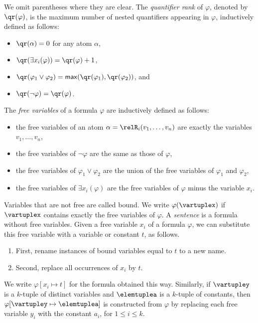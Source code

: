 \noindent
We omit parentheses where they are clear.
The \emph{quantifier rank} of $\varphi$, denoted by $\qr(\varphi)$, is the maximum number of nested quantifiers appearing in $\varphi$, inductively defined as follows:
\begin{itemize}
  \item $\qr(\alpha) = 0$ for any atom $\alpha$,
  \item $\qr(\exists{x_{i}}(\varphi)) = \qr(\varphi) + 1$,
  \item $\qr(\varphi_{1} \lor \varphi_{2}) = \mathsf{max}(\qr(\varphi_{1}), \qr(\varphi_{2}))$, and
  \item $\qr(\neg \varphi)  = \qr(\varphi)$.
\end{itemize}

\begin{samepage}%
\noindent%
The \emph{free variables} of a formula $\varphi$ are inductively defined as follows:
\begin{itemize}
  \item the free variables of an atom $\alpha = \relR_{i}(v_{1}, \ldots, v_{n})$ are exactly the variables $v_{1}, \ldots, v_{n}$,
  \item the free variables of $\neg \varphi$ are the same as those of $\varphi$,
  \item the free variables of $\varphi_{1} \lor \varphi_{2}$ are the union of the free variables of $\varphi_{1}$ and $\varphi_{2}$,
  \item the free variables of $\exists{x_{i}(\varphi)}$ are the free variables of $\varphi$ minus the variable $x_{i}$.
\end{itemize}
\end{samepage}
Variables that are not free are called bound.
We write $\varphi(\vartuplex)$ if $\vartuplex$ contains exactly the free variables of $\varphi$.
A \emph{sentence} is a formula without free variables.
Given a free variable $x_{i}$ of a formula $\varphi$, we can substitute this free variable with a variable or constant $t$, as follows.
\begin{enumerate}
  \item First, rename instances of bound variables equal to $t$ to a new name.
  \item Second, replace all occurrences of $x_{i}$ by $t$.
\end{enumerate}
We write $\varphi[x_{i} \mapsto t]$ for the formula obtained this way.
Similarly, if $\vartupley$ is a $k$-tuple of distinct variables and $\elemtuplea$ is a $k$-tuple of constants, then $\varphi[\vartupley \mapsto \elemtuplea]$ is constructed from $\varphi$ by replacing each free variable $y_{i}$ with the constant $a_{i}$, for $1 \le i \le k$.

